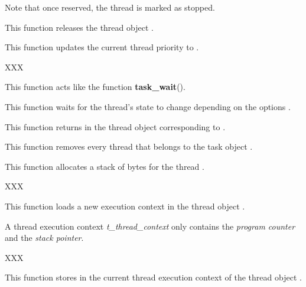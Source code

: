\begin{itemize}
{	   Note that once reserved, the thread is marked as stopped.
	 }

	 {
	   This function releases the thread object .
	 }

	 {
	   This function updates the current thread priority
	   to .
	 }

	 {
	   XXX
	 }

	 {
	   This function acts like the function \textbf{task\_wait}().

	   This function waits for the thread's state to change depending on
	   the options .

	 }

	 {
	   This function returns in  the thread object
	   corresponding to .
	 }

	 {
	   This function removes every thread that belongs to the
	   task object .
	 }

	 {
	   This function allocates a stack of  bytes
	   for the thread .

	   XXX
	 }

	 {
	   This function loads a new execution context in the thread
	   object .

	   A thread execution context \textit{t\_thread\_context}
	   only contains the \textit{program counter} and the
	   \textit{stack pointer}.

	   XXX
	 }

	 {
	   This function stores in  the current
	   thread execution context of the thread object .

}
\end{itemize}
